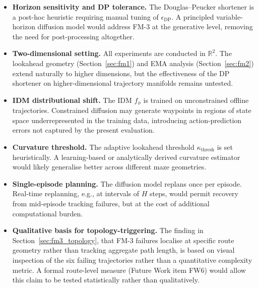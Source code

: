 \documentclass[12pt, a4paper, oneside]{report}
\theoremstyle{definition}
\newcommand{\R}{\mathbb{R}}
\begin{document}
\begin{itemize}[itemsep=5pt]

\item \textbf{Horizon sensitivity and DP tolerance.}
  The Douglas--Peucker shortener is a post-hoc heuristic requiring
  manual tuning of $\epsilon_{\mathrm{DP}}$. A principled
  variable-horizon diffusion model would address FM-3 at the
  generative level, removing the need for post-processing
  altogether.

\item \textbf{Two-dimensional setting.}
  All experiments are conducted in $\R^2$. The lookahead geometry
  (Section~\ref{sec:fm1}) and EMA analysis (Section~\ref{sec:fm2})
  extend naturally to higher dimensions, but the effectiveness of
  the DP shortener on higher-dimensional trajectory manifolds
  remains untested.

\item \textbf{IDM distributional shift.}
  The IDM $f_\phi$ is trained on unconstrained offline
  trajectories. Constrained diffusion may generate waypoints in
  regions of state space underrepresented in the training data,
  introducing action-prediction errors not captured by the present
  evaluation.

\item \textbf{Curvature threshold.}
  The adaptive lookahead threshold $\kappa_{\mathrm{thresh}}$ is
  set heuristically. A learning-based or analytically derived
  curvature estimator would likely generalise better across
  different maze geometries.

\item \textbf{Single-episode planning.}
  The diffusion model replans once per episode. Real-time
  replanning, e.g., at intervals of $H$ steps, would permit
  recovery from mid-episode tracking failures, but at the cost of
  additional computational burden.

\item \textbf{Qualitative basis for topology-triggering.}
  The finding in Section~\ref{sec:fm3_topology}, that FM-3 failures
  localise at specific route geometry rather than tracking aggregate
  path length, is based on visual inspection of the six failing
  trajectories rather than a quantitative complexity metric. A
  formal route-level measure (Future Work item FW6) would allow this
  claim to be tested statistically rather than qualitatively.

\end{itemize}

\end{document}
